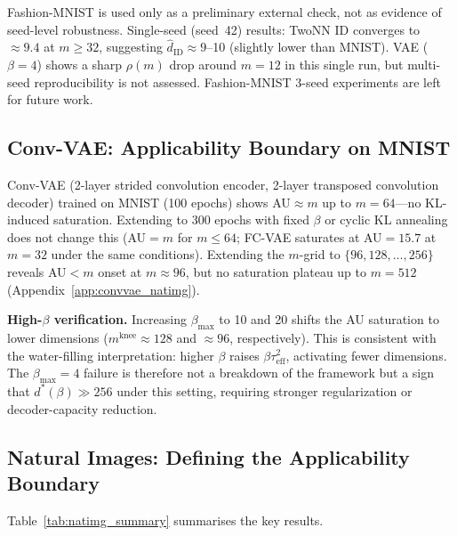 \documentclass[make,article,submit,pdftex,moreauthors]{Definitions/mdpi}
\newcommand{\mknee}{m^{\mathrm{knee}}}
\newcommand{\hatdID}{\hat{d}_{\mathrm{ID}}}
\begin{document}
Fashion-MNIST is used only as a preliminary external check, not as
evidence of seed-level robustness.
Single-seed (seed~42) results: TwoNN ID converges to $\approx9.4$ at $m\geq32$,
suggesting $\hatdID\approx9$--10 (slightly lower than MNIST).
VAE ($\beta=4$) shows a sharp $\rho(m)$ drop around $m=12$ in this single run,
but multi-seed reproducibility is not assessed.
Fashion-MNIST 3-seed experiments are left for future work.

\subsection{Conv-VAE: Applicability Boundary on MNIST}\label{sec:exp_conv}

Conv-VAE (2-layer strided convolution encoder, 2-layer transposed convolution
decoder) trained on MNIST (100 epochs) shows AU$\approx m$ up to $m=64$---no
KL-induced saturation.
Extending to 300 epochs with fixed $\beta$ or cyclic KL annealing~\cite{fu2019cyclical} does not
change this (AU$=m$ for $m\leq64$; FC-VAE saturates at AU$=15.7$ at $m=32$
under the same conditions).
Extending the $m$-grid to $\{96,128,\ldots,256\}$ reveals AU$<m$ onset at
$m\approx96$, but no saturation plateau up to $m=512$ (Appendix~\ref{app:convvae_natimg}).

\textbf{High-$\beta$ verification.}
Increasing $\beta_{\max}$ to 10 and 20 shifts the AU saturation to lower
dimensions ($\mknee\approx128$ and $\approx96$, respectively).
This is consistent with the water-filling interpretation: higher $\beta$ raises
$\beta\tau^2_{\mathrm{eff}}$, activating fewer dimensions.
The $\beta_{\max}=4$ failure is therefore not a breakdown of the framework but
a sign that $d^*(\beta)\gg256$ under this setting, requiring stronger
regularization or decoder-capacity reduction.

\subsection{Natural Images: Defining the Applicability Boundary}\label{sec:exp_natural}

Table~\ref{tab:natimg_summary} summarises the key results.
\end{document}
